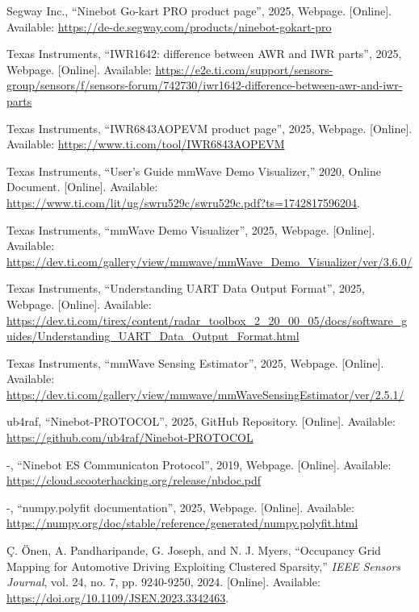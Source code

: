 \newpage

\begin{thebibliography}{00}

 Segway Inc., ``Ninebot Go-kart PRO product page'', 2025, Webpage. [Online]. Available: \url{https://de-de.segway.com/products/ninebot-gokart-pro}

 Texas Instruments, ``IWR1642: difference between AWR and IWR parts'', 2025, Webpage. [Online]. Available: \url{https://e2e.ti.com/support/sensors-group/sensors/f/sensors-forum/742730/iwr1642-difference-between-awr-and-iwr-parts}

 Texas Instruments, ``IWR6843AOPEVM product page'', 2025, Webpage. [Online]. Available: \url{https://www.ti.com/tool/IWR6843AOPEVM}

 Texas Instruments, ``User's Guide mmWave Demo Visualizer,'' 2020, Online Document. [Online]. Available: \url{https://www.ti.com/lit/ug/swru529c/swru529c.pdf?ts=1742817596204}.

Texas Instruments, 
``mmWave Demo Visualizer'', 2025, Webpage. [Online]. Available: \url{https://dev.ti.com/gallery/view/mmwave/mmWave_Demo_Visualizer/ver/3.6.0/}

 Texas Instruments, ``Understanding UART Data Output Format'', 2025, Webpage. [Online]. Available: \url{https://dev.ti.com/tirex/content/radar_toolbox_2_20_00_05/docs/software_guides/Understanding_UART_Data_Output_Format.html}

 Texas Instruments, ``mmWave Sensing Estimator'', 2025, Webpage. [Online]. Available: \url{https://dev.ti.com/gallery/view/mmwave/mmWaveSensingEstimator/ver/2.5.1/}

 ub4raf, ``Ninebot-PROTOCOL'', 2025, GitHub Repository. [Online]. Available: \url{https://github.com/ub4raf/Ninebot-PROTOCOL}

 -, ``Ninebot ES Communicaton Protocol'', 2019, Webpage. [Online]. Available: \url{https://cloud.scooterhacking.org/release/nbdoc.pdf}

 -, ``numpy.polyfit documentation'', 2025, Webpage. [Online]. Available: \url{https://numpy.org/doc/stable/reference/generated/numpy.polyfit.html}

 Ç. Önen, A. Pandharipande, G. Joseph, and N. J. Myers, ``Occupancy Grid Mapping for Automotive Driving Exploiting Clustered Sparsity,'' \textit{IEEE Sensors Journal}, vol. 24, no. 7, pp. 9240-9250, 2024. [Online]. Available: \url{https://doi.org/10.1109/JSEN.2023.3342463}.


\end{thebibliography}
